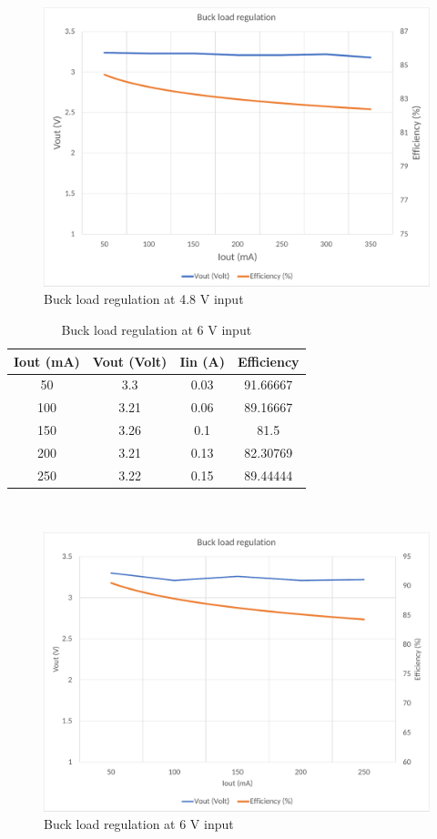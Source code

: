 \\
\begin{figure}[H]
	\centering
	\includegraphics[width=0.85\columnwidth]{IMGS/Buck load regulation at 4.8V input.pdf}
	\caption{Buck load regulation at 4.8 V input}
	\label{fig:arch}
\end{figure}
\begin{table}[H]
\centering
\begin{tabular}{c c c c}
\toprule
Iout (mA) & Vout (Volt) & Iin (A) & Efficiency \\ \midrule\midrule
50        & 3.3         & 0.03    & 91.66667   \\ 
100       & 3.21        & 0.06    & 89.16667   \\ 
150       & 3.26        & 0.1     & 81.5       \\ 
200       & 3.21        & 0.13    & 82.30769   \\ 
250       & 3.22        & 0.15    & 89.44444   \\ 
\bottomrule
\end{tabular}
\caption{Buck load regulation at 6 V input}
\label{table:4}
\end{table}
\\
\begin{figure}[H]
	\centering
	\includegraphics[width=0.85\columnwidth]{IMGS/Buck load regulation at 6V input.pdf}
	\caption{Buck load regulation at 6 V input}
	\label{fig:arch}
\end{figure}

